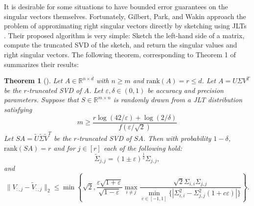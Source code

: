 \documentclass{report}
\newtheorem{theorem}{Theorem}[section]
\newcommand{\rank}{\mathrm{rank}}
\begin{document}
It is desirable for some situations to have bounded error guarantees on the singular vectors themselves. 
Fortunately, Gilbert, Park, and Wakin approach the problem of approximating right singular vectors directly by sketching using JLTs \cite{gilbert2012sketched} \cite{anaraki2014memory}. 
Their proposed algorithm is very simple: Sketch the left-hand side of a matrix, compute the truncated SVD of the sketch, and return the singular values and right singular vectors. 
The following theorem, corresponding to Theorem 1 of \cite{gilbert2012sketched} summarizes their results:
%
\begin{theorem}[\cite{gilbert2012sketched}] \label{thm:svdapprox}
Let $A \in \mathbb{R}^{n \times d}$ with $n \geq m$ and $\rank(A) = r \leq d$. 
Let $A = U \Sigma V^T$ be the $r$-truncated SVD of $A$. 
Let $\varepsilon, \delta \in (0,1)$ be accuracy and precision parameters. 
Suppose that $S \in \mathbb{R}^{m \times n}$ is randomly drawn from a JLT distribution satisfying
%
\begin{equation*}
m \geq \frac{r \log (42/\varepsilon) + \log (2/\delta)}{f(\varepsilon/\sqrt{2})}
\end{equation*}
%
Let $SA = \widetilde{U} \widetilde{\Sigma} \widetilde{V}^T$ be the $r$-truncated SVD of $SA$.
Then with probability $1-\delta$, $\rank(SA) = r$ and for $j \in [r]$ each of the following hold:
%
%
\begin{equation*}
\widetilde{\Sigma}_{j,j} = (1 \pm \varepsilon)^{\frac{1}{2}} \Sigma_{j,j},
\end{equation*}
%
and
%
\begin{equation} \label{eq:singvecapprox}
\|V_{:,j} - \widetilde{V}_{:,j}\|_2 \leq
\min 
\left \{ 
\sqrt{2}, 
\frac{\varepsilon \sqrt{1+ \varepsilon}}{\sqrt{1-\varepsilon}}
\max\limits_{i\neq j}
\frac{\sqrt{2} \Sigma_{i,i} \Sigma_{j,j}}
{\min\limits_{c \in [-1,1]} \{| \Sigma_{i,i}^2 - \Sigma_{j,j}^2 (1 + c\varepsilon)|\}}
\right \}.
\end{equation}
%
%
\end{theorem}
%
\end{document}
